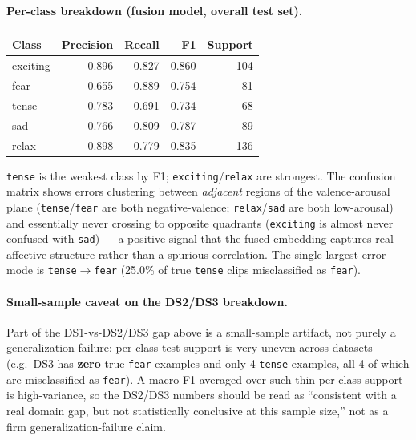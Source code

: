 \documentclass[11pt]{article}
\begin{document}
\paragraph{Per-class breakdown (fusion model, overall test set).}
\begin{center}
\begin{tabular}{@{}lrrrr@{}}
\toprule
Class & Precision & Recall & F1 & Support \\
\midrule
exciting & 0.896 & 0.827 & 0.860 & 104 \\
fear & 0.655 & 0.889 & 0.754 & 81 \\
tense & 0.783 & 0.691 & 0.734 & 68 \\
sad & 0.766 & 0.809 & 0.787 & 89 \\
relax & 0.898 & 0.779 & 0.835 & 136 \\
\bottomrule
\end{tabular}
\end{center}
\texttt{tense} is the weakest class by F1; \texttt{exciting}/\texttt{relax} are strongest. The
confusion matrix shows errors clustering between \emph{adjacent} regions of the valence-arousal
plane (\texttt{tense}/\texttt{fear} are both negative-valence; \texttt{relax}/\texttt{sad} are both
low-arousal) and essentially never crossing to opposite quadrants (\texttt{exciting} is almost
never confused with \texttt{sad}) --- a positive signal that the fused embedding captures real
affective structure rather than a spurious correlation. The single largest error mode is
\texttt{tense}$\to$\texttt{fear} (25.0\% of true \texttt{tense} clips misclassified as
\texttt{fear}).

\paragraph{Small-sample caveat on the DS2/DS3 breakdown.} Part of the DS1-vs-DS2/DS3 gap above is a
small-sample artifact, not purely a generalization failure: per-class test support is very uneven
across datasets (e.g.\ DS3 has \textbf{zero} true \texttt{fear} examples and only 4 \texttt{tense}
examples, all 4 of which are misclassified as \texttt{fear}). A macro-F1 averaged over such thin
per-class support is high-variance, so the DS2/DS3 numbers should be read as ``consistent with a
real domain gap, but not statistically conclusive at this sample size,'' not as a firm
generalization-failure claim.
\end{document}

